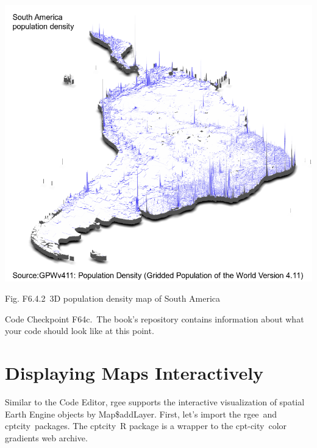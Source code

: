 \documentclass[
  letterpaper,
  DIV=11,
  numbers=noendperiod]{scrreprt}
\begin{document}
\includegraphics{./F6/image2.png}

Fig. F6.4.2~3D population density map of South America

\begin{tcolorbox}[enhanced jigsaw, left=2mm, breakable, rightrule=.15mm, opacityback=0, colframe=quarto-callout-note-color-frame, colbacktitle=quarto-callout-note-color!10!white, arc=.35mm, opacitybacktitle=0.6, toptitle=1mm, colback=white, leftrule=.75mm, title=\textcolor{quarto-callout-note-color}{\faInfo}\hspace{0.5em}{Note}, toprule=.15mm, bottomtitle=1mm, titlerule=0mm, bottomrule=.15mm, coltitle=black]

Code Checkpoint F64c.~The book's repository contains information about
what your code should look like at this point.

\end{tcolorbox}

\hypertarget{displaying-maps-interactively}{%
\section{Displaying Maps
Interactively}\label{displaying-maps-interactively}}

Similar to the Code Editor, rgee supports the interactive visualization
of spatial Earth Engine objects by Map\$addLayer. First, let's import
the rgee~and cptcity~packages. The cptcity~R package is a wrapper to the
cpt-city~color gradients web archive.
\end{document}
